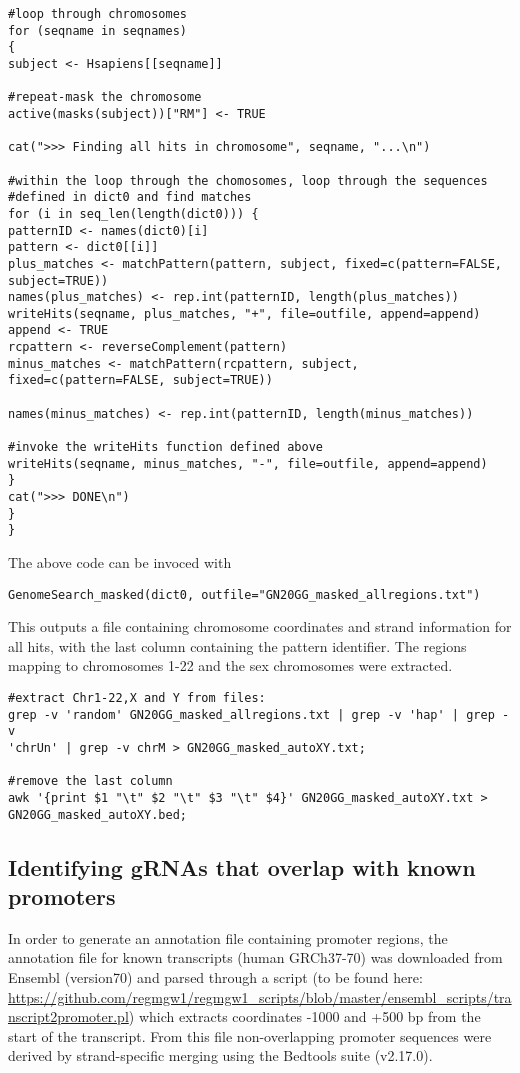 \begin{footnotesize}
\begin{lstlisting}
#loop through chromosomes
for (seqname in seqnames) 
{
subject <- Hsapiens[[seqname]]

#repeat-mask the chromosome
active(masks(subject))["RM"] <- TRUE

cat(">>> Finding all hits in chromosome", seqname, "...\n")

#within the loop through the chomosomes, loop through the sequences 
#defined in dict0 and find matches
for (i in seq_len(length(dict0))) {
patternID <- names(dict0)[i]
pattern <- dict0[[i]]
plus_matches <- matchPattern(pattern, subject, fixed=c(pattern=FALSE, subject=TRUE))
names(plus_matches) <- rep.int(patternID, length(plus_matches))
writeHits(seqname, plus_matches, "+", file=outfile, append=append)
append <- TRUE
rcpattern <- reverseComplement(pattern)
minus_matches <- matchPattern(rcpattern, subject, fixed=c(pattern=FALSE, subject=TRUE))

names(minus_matches) <- rep.int(patternID, length(minus_matches))

#invoke the writeHits function defined above
writeHits(seqname, minus_matches, "-", file=outfile, append=append)
}
cat(">>> DONE\n") 
}
}
\end{lstlisting}

The above code can be invoced with 
\begin{lstlisting}
GenomeSearch_masked(dict0, outfile="GN20GG_masked_allregions.txt")
\end{lstlisting}
This outputs a file containing chromosome coordinates and strand information for all hits, with the last column containing the pattern identifier. The regions mapping to chromosomes 1-22 and the sex chromosomes were extracted.

\begin{lstlisting}
#extract Chr1-22,X and Y from files:
grep -v 'random' GN20GG_masked_allregions.txt | grep -v 'hap' | grep -v 
'chrUn' | grep -v chrM > GN20GG_masked_autoXY.txt;

#remove the last column
awk '{print $1 "\t" $2 "\t" $3 "\t" $4}' GN20GG_masked_autoXY.txt >
GN20GG_masked_autoXY.bed;
\end{lstlisting}

\subsection{Identifying gRNAs that overlap with known promoters}

In order to generate an annotation file containing promoter regions,  the annotation file for known transcripts (human GRCh37-70) was downloaded from Ensembl (version70) and parsed through a script (to be found here: \url{https://github.com/regmgw1/regmgw1_scripts/blob/master/ensembl_scripts/transcript2promoter.pl}) which extracts coordinates -1000 and +500 bp from the start of the transcript. From this file non-overlapping promoter sequences were derived by strand-specific merging using the Bedtools suite (v2.17.0).


\end{footnotesize}
